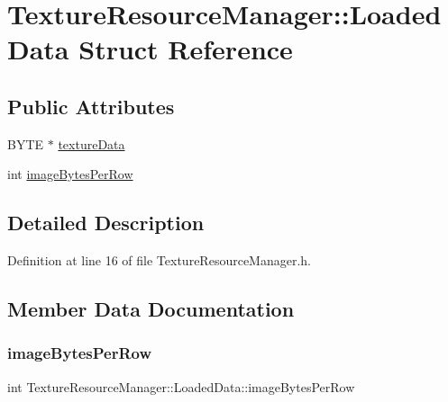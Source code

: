 \hypertarget{struct_texture_resource_manager_1_1_loaded_data}{}\section{Texture\+Resource\+Manager\+:\+:Loaded\+Data Struct Reference}
\label{struct_texture_resource_manager_1_1_loaded_data}
\subsection*{Public Attributes}
\begin{DoxyCompactItemize}
\item 
B\+Y\+TE $\ast$ \mbox{\hyperlink{struct_texture_resource_manager_1_1_loaded_data_ab8f8bbcc8db59da66d27455d98fec3d0}{texture\+Data}}
\item 
int \mbox{\hyperlink{struct_texture_resource_manager_1_1_loaded_data_a606406cf7042b156ccaaff5c718f3d4a}{image\+Bytes\+Per\+Row}}
\end{DoxyCompactItemize}


\subsection{Detailed Description}


Definition at line 16 of file Texture\+Resource\+Manager.\+h.



\subsection{Member Data Documentation}
\mbox{\label{struct_texture_resource_manager_1_1_loaded_data_a606406cf7042b156ccaaff5c718f3d4a}} 
\subsubsection{\texorpdfstring{image\+Bytes\+Per\+Row}{imageBytesPerRow}}
{\footnotesize\ttfamily int Texture\+Resource\+Manager\+::\+Loaded\+Data\+::image\+Bytes\+Per\+Row}



